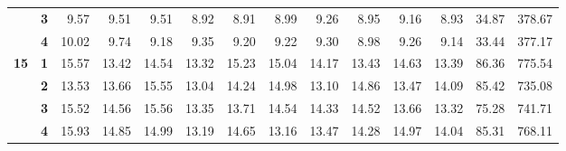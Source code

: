\begin{table}[h!]
{\begin{tabular}{@{} ccrrrrrrrrrrrr}
\textbf{}   & \textbf{3}                     & 9.57                             & 9.51                             & 9.51                             & 8.92                             & 8.91                             & 8.99                             & 9.26                             & 8.95                             & 9.16                             & 8.93                             & 34.87                           & 378.67                             \\
\textbf{}   & \textbf{4}                     & 10.02                            & 9.74                             & 9.18                             & 9.35                             & 9.20                             & 9.22                             & 9.30                             & 8.98                             & 9.26                             & 9.14                             & 33.44                           & 377.17                             \\
\textbf{15} & \textbf{1}                     & 15.57                            & 13.42                            & 14.54                            & 13.32                            & 15.23                            & 15.04                            & 14.17                            & 13.43                            & 14.63                            & 13.39                            & 86.36                           & 775.54                             \\
\textbf{}   & \textbf{2}                     & 13.53                            & 13.66                            & 15.55                            & 13.04                            & 14.24                            & 14.98                            & 13.10                            & 14.86                            & 13.47                            & 14.09                            & 85.42                           & 735.08                             \\
\textbf{}   & \textbf{3}                     & 15.52                            & 14.56                            & 15.56                            & 13.35                            & 13.71                            & 14.54                            & 14.33                            & 14.52                            & 13.66                            & 13.32                            & 75.28                           & 741.71                             \\
\textbf{}   & \textbf{4}                     & 15.93                            & 14.85                            & 14.99                            & 13.19                            & 14.65                            & 13.16                            & 13.47                            & 14.28                            & 14.97                            & 14.04                            & 85.31                           & 768.11                             \\

\end{tabular}}
\end{table}
